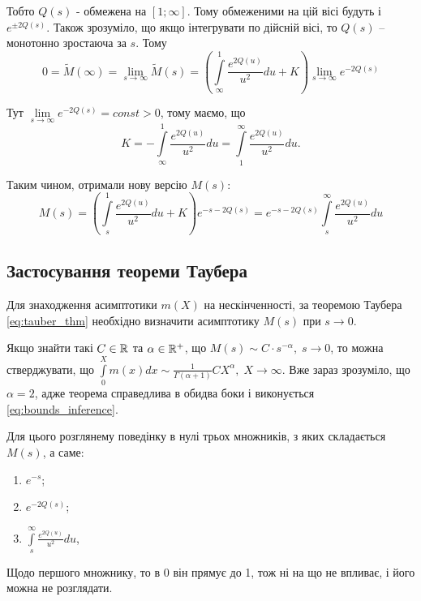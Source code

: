 Тобто $Q(s)$ - обмежена на $[1; \infty]$. Тому обмеженими на цій вісі будуть і $e^{\pm 2Q(s)}$. Також зрозуміло, що якщо інтегрувати по дійсній вісі, то $Q(s)$ – монотонно зростаюча за $s$. Тому
\begin{equation}
	0 = \tilde M(\infty) = \lim_{s\rightarrow \infty} \tilde M(s) = \left( \int\limits_\infty^1 \frac{e^{2Q(u)}}{u^2} du + K \right) \lim_{s\rightarrow \infty} e^{- 2Q(s)}
\end{equation}

Тут $\lim\limits_{s\rightarrow \infty} e^{- 2Q(s)} = const > 0$, тому маємо, що
\begin{equation}
	K = -  \int\limits_\infty^1 \frac{e^{2Q(u)}}{u^2} du =  \int\limits_1^\infty \frac{e^{2Q(u)}}{u^2} du.
\end{equation}

Таким чином, отримали нову версію $M(s)$:
\begin{equation}
	\label{eq:uniform_laplace_sol}
	M(s)= \left( \int\limits_s^1 \frac{e^{2Q(u)}}{u^2} du + K \right) e^{- s - 2Q(s)} = 
	e^{- s - 2Q(s)} \int\limits_s^\infty \frac{e^{2Q(u)}}{u^2} du
\end{equation}

\subsection{Застосування теореми Таубера}

Для знаходження асимптотики $m(X)$ на нескінченності, за теоремою Таубера \eqref{eq:tauber_thm} необхідно визначити асимптотику $M(s)$ при $s \rightarrow 0$.

Якщо знайти такі $C \in \mathbb{R}$ та $\alpha \in \mathbb{R}^+$, що $M(s) \sim C \cdot s^{-\alpha}, \; s \rightarrow 0$, то можна стверджувати, що $\int\limits_0^X m(x) dx \sim \frac{1}{\Gamma(\alpha + 1)} C X^\alpha, \; X \rightarrow \infty$. Вже зараз зрозуміло, що $\alpha = 2$, адже теорема справедлива в обидва боки і виконується \eqref{eq:bounds_inference}.

Для цього розглянему поведінку в нулі трьох множників, з яких складається $M(s)$, а саме:
\begin{enumerate}
	\item $e^{-s}$;
	\item $e^{-2Q(s)}$;
	\item $\int\limits_s^\infty \frac{e^{2Q(u)}}{u^2} du$,
\end{enumerate}

Щодо першого множнику, то в 0 він прямує до 1, тож ні на що не впливає, і його можна не розглядати.

